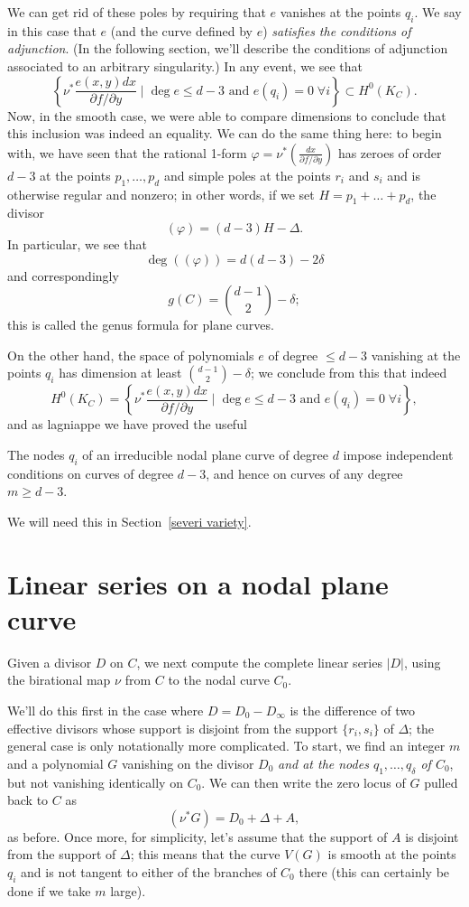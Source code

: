 We can get rid of these poles by requiring that $e$ vanishes at the points $q_i$. We say in this case that $e$ (and the curve defined by $e$) \emph{satisfies the conditions of adjunction}. (In the following section, we'll describe the  conditions of adjunction associated to an arbitrary singularity.) In any event, we see that
$$
 \left\{ \nu^* \frac{e(x,y)dx}{\partial f/\partial y} \mid \deg e \leq d-3 \text{ and } e(q_i) = 0 \; \forall i \right\} \subset H^0(K_C).
$$
Now, in the smooth case, we were able to compare dimensions to conclude that this inclusion was indeed an equality. We can do the same thing here: to begin with, we have seen that the  rational 1-form $\varphi = \nu^*(\frac{dx}{\partial f/\partial y})$ has zeroes of order $d-3$ at the points $p_1,\dots,p_d$ and simple poles at the points $r_i$ and $s_i$ and is otherwise regular and nonzero; in other words, if we set $H = p_1+\dots + p_d$, the divisor
$$
(\varphi) = (d-3)H - \Delta.
$$
In particular, we see that
$$
\deg((\varphi)) = d(d-3) - 2\delta
$$
and correspondingly
$$
g(C) = \binom{d-1}{2} - \delta;
$$
this is called the genus formula for plane curves.

On the other hand, the space of polynomials $e$ of degree $\leq d-3$ vanishing at the points $q_i$ has dimension at least $ \binom{d-1}{2} - \delta$; we conclude from this that indeed
$$
H^0(K_C) =  \left\{ \nu^* \frac{e(x,y)dx}{\partial f/\partial y} \mid \deg e \leq d-3 \text{ and } e(q_i) = 0 \; \forall i \right\},
$$
and as lagniappe we have proved the useful

\begin{lemma}\label{adjoint independent}
The nodes $q_i$ of an irreducible nodal plane curve of degree $d$ impose independent conditions on curves of degree $d-3$, and hence on curves of any degree $m \geq d-3$.
\end{lemma}

We will need this in Section~\ref{severi variety}.

\section{Linear series on a nodal plane curve}\label{linear series on nodal plane curves}

Given a divisor $D$ on $C$, we next compute the complete linear series $|D|$, using the birational map $\nu$ from 
$C$ to the nodal curve $C_0$.

We'll do this first in the case where $D = D_0-D_\infty$ is the difference of two effective divisors whose support is disjoint from the support $\{r_i, s_i\}$ of $\Delta$; the general case is only notationally more complicated. To start, we find an integer $m$ and a polynomial $G$ vanishing on the divisor $D_0$ \emph{and at the nodes $q_1,\dots,q_\delta$ of $C_0$}, but not vanishing identically on $C_0$. We can then write the zero locus of $G$ pulled back to $C$ as
$$
(\nu^*G) = D_0 + \Delta + A,
$$
as before. Once more, 
 for simplicity, let's assume that the support of $A$ is disjoint from the support of $\Delta$; this means 
  that the curve $V(G)$ is smooth at the points $q_i$ and is not tangent to either of the branches of $C_0$ there (this can certainly be done if we take $m$ large).

